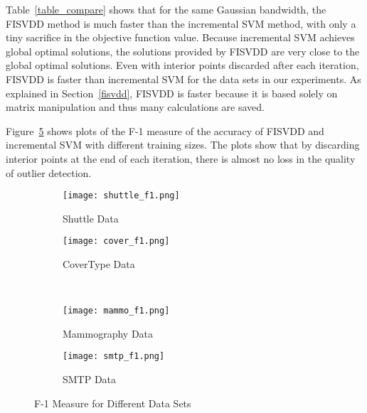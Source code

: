 \documentclass{article}
\newcommand{\fref}[1]{Figure~\ref{#1}}
\newcommand{\tref}[1]{Table~\ref{#1}}
\newcommand{\sref}[1]{Section~\ref{#1}}
\numberwithin{equation}{section}
\begin{document}
\tref{table_compare} shows that for the same Gaussian bandwidth, the FISVDD method is much faster than the incremental SVM method, with only a tiny sacrifice in the objective function value. Because incremental SVM achieves global optimal solutions, the solutions provided by FISVDD are very close to the global optimal solutions. Even with interior points discarded after each iteration, FISVDD is faster than incremental SVM for the data sets in our experiments.  As explained in \sref{fisvdd}, FISVDD is faster because it is based solely on matrix manipulation and thus many calculations are saved. 

\fref{pics} shows plots of the F-1 measure \citep{tan2007introduction} of the accuracy of FISVDD and incremental SVM with different training sizes. The plots show that by discarding interior points at the end of each iteration, there is almost no loss in the quality of outlier detection.

\begin{figure}
\centering
\begin{subfigure}{.5\columnwidth}
  \centering
  \texttt{[image: shuttle\_f1.png]}
 \caption{Shuttle Data}
  \label{fig:sub1}
\end{subfigure}%
\begin{subfigure}{.5\columnwidth}
  \centering
  \texttt{[image: cover\_f1.png]}
  \caption{CoverType Data}
  \label{fig:sub2}
\end{subfigure}\\[1ex]
\begin{subfigure}{.5\columnwidth}
  \centering
  \texttt{[image: mammo\_f1.png]}
  \caption{Mammography Data}
  \label{fig:sub3}
\end{subfigure}%
\begin{subfigure}{.5\columnwidth}
  \centering
  \texttt{[image: smtp\_f1.png]}
  \caption{SMTP Data}
  \label{fig:sub4}
\end{subfigure}
\caption{F-1 Measure for Different Data Sets}
\label{pics}
\end{figure} 
\end{document}
